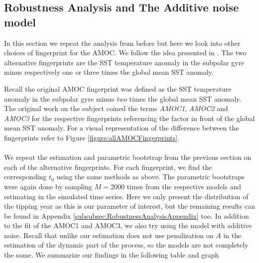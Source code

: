 \subsection{Robustness Analysis and The Additive noise model}
In this section we repeat the analysis from before but here we look into other choices of fingerprint for the AMOC. We follow the idea presented in \cite{Ditlevsen2023}. The two alternative fingerprints are the SST temperature anomaly in the subpolar gyre minus respectively one or three times the global mean SST anomaly.

Recall the original AMOC fingerprint was defined as the SST temperature anomaly in the subpolar gyre minus \textit{two} times the global mean SST anomaly. The original work on the subject coined the terms \textit{AMOC1}, \textit{AMOC2} and \textit{AMOC3} for the respective fingerprints referencing the factor in front of the global mean SST anomaly. For a visual representation of the difference between the fingerprints refer to Figure \ref{figure:allAMOCFingerprints}.\\\\
We repeat the estimation and parametric bootstrap from the previous section on each of the alternative fingerprints. For each fingerprint, we find the corresponding $t_0$ using the same methods as above. The parametric bootstraps were again done by sampling $M = 2000$ times from the respective models and estimating in the simulated time series. Here we only present the distribution of the tipping year as this is our parameter of interest, but the remaining results can be found in Appendix \ref{subsubsec:RobustnessAnalysisAppendix} too. In addition to the fit of the AMOC1 and AMOC3, we also try using the model with additive noise. Recall that unlike \cite{Ditlevsen2023} our estimation does not use penalization on $A$ in the estimation of the dynamic part of the process, so the models are not completely the same. We summarize our findings in the following table and graph
